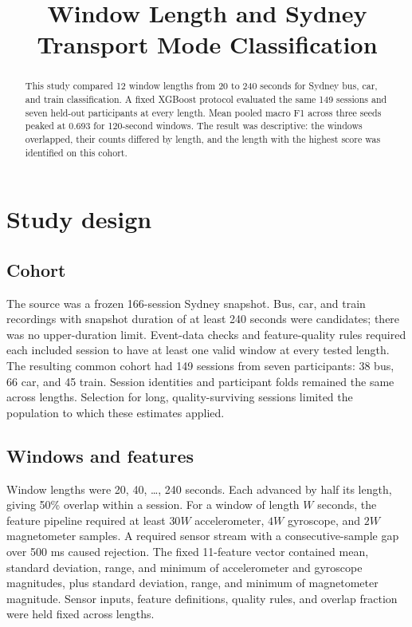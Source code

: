 \documentclass[11pt,a4paper]{article}
\title{Window Length and Sydney Transport Mode Classification}
\author{}
\date{}
\begin{document}
\maketitle

\begin{abstract}
This study compared 12 window lengths from 20 to 240 seconds for Sydney bus,
car, and train classification. A fixed XGBoost protocol evaluated the same
149 sessions and seven held-out participants at every length. Mean pooled
macro F1 across three seeds peaked at 0.693 for 120-second windows. The result
was descriptive: the windows overlapped, their counts differed by length, and the
length with the highest score was identified on this cohort.
\end{abstract}

\section{Study design}
\subsection{Cohort}
The source was a frozen 166-session Sydney snapshot. Bus, car, and train
recordings with snapshot duration of at least 240 seconds were candidates;
there was no upper-duration limit. Event-data checks and feature-quality rules
required each included session to have at least one valid window at every
tested length. The resulting common cohort had 149 sessions from seven
participants: 38 bus, 66 car, and 45 train. Session identities and
participant folds remained the same across lengths. Selection for long,
quality-surviving sessions limited the population to which these estimates
applied.

\subsection{Windows and features}
Window lengths were 20, 40, \ldots, 240 seconds. Each advanced by half its
length, giving 50\% overlap within a session. For a window of length $W$
seconds, the feature pipeline required at least $30W$ accelerometer, $4W$
gyroscope, and $2W$ magnetometer samples. A required sensor stream with a
consecutive-sample gap over 500 ms caused rejection. The fixed 11-feature
vector contained mean, standard deviation, range, and minimum of
accelerometer and gyroscope magnitudes, plus standard deviation, range, and
minimum of magnetometer magnitude. Sensor inputs, feature definitions,
quality rules, and overlap fraction were held fixed across lengths.
\end{document}
